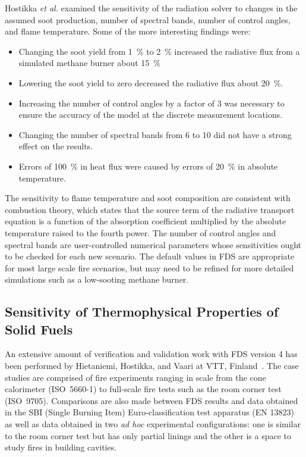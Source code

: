 \documentclass[11pt]{book}
\begin{document}
Hostikka {\em et al.} examined the sensitivity of the radiation solver to changes in  the assumed soot production, number  of spectral bands, number
of control  angles, and  flame temperature.  Some of  the more interesting findings were:
\begin{itemize}
\item  Changing  the  soot  yield  from 1~\%  to  2~\%  increased  the
radiative flux from a simulated methane burner about 15~\%
\item Lowering  the soot  yield to zero  decreased the  radiative flux
about 20~\%.
\item Increasing  the number of  control angles by  a factor of  3 was
necessary  to  ensure  the  accuracy  of the  model  at  the  discrete measurement locations.
\item Changing the number of spectral  bands from 6 to 10 did not have
a strong effect on the results.
\item Errors of 100~\% in heat  flux were caused by errors of 20~\% in
absolute temperature.
\end{itemize}
The  sensitivity  to  flame   temperature  and  soot  composition  are consistent with  combustion theory, which states that  the source term of the
radiative transport equation  is a function of  the absorption coefficient  multiplied  by the  absolute  temperature  raised to  the fourth  power.
The  number of  control angles  and spectral  bands are user-controlled numerical  parameters whose sensitivities  ought to be checked  for  each
new  scenario.  The  default  values  in  FDS  are appropriate for  most large scale fire  scenarios, but may  need to be refined for  more detailed
simulations  such as a  low-sooting methane burner.


\subsection{Sensitivity of Thermophysical Properties of Solid Fuels}

An  extensive amount  of  verification and  validation  work with  FDS version 4  has been  performed by Hietaniemi,  Hostikka, and  Vaari at VTT,
Finland~\cite{Hietaniemi:1}. The case  studies are  comprised of fire  experiments   ranging  in   scale  from  the   cone  calorimeter (ISO~5660-1)
to  full-scale fire  tests such as  the room  corner test (ISO~9705).  Comparisons are also  made between  FDS results  and data obtained  in the
SBI (Single  Burning Item)  Euro-classification test apparatus (EN  13823) as  well as  data obtained in  two {\em  ad hoc} experimental
configurations:  one is similar  to the room  corner test but has only  partial linings and the other is a  space to study fires in building
cavities.
\end{document}
